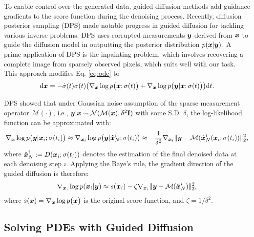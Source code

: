 To enable control over the generated data, guided diffusion methods \cite{dhariwal2021diffusion} add guidance gradients to the score function during the denoising process. Recently, diffusion posterior sampling (DPS) \cite{chung2022diffusion} made notable progress in guided diffusion for tackling various inverse problems. DPS uses corrupted measurements $\boldsymbol{y}$ derived from $\boldsymbol{x}$ to guide the diffusion model in outputting the posterior distribution $p(\boldsymbol{x}|\boldsymbol{y})$. A prime application of DPS is the inpainting problem, which involves recovering a complete image from sparsely observed pixels, which suits well with our task. This approach modifies Eq. \ref{eq:ode} to
\begin{equation}
    \label{eq:ode-dps}
    \mathrm{d}\boldsymbol{x} = -\dot{\sigma}(t) \sigma(t) \big(\nabla_{\boldsymbol{x}}\log p\big(\boldsymbol{x};\sigma(t)\big)+\nabla_{\boldsymbol{x}}\log p\big(\boldsymbol{y}|\boldsymbol{x};\sigma(t)\big)\big)\mathrm{d}t.
\end{equation}

DPS \cite{chung2022diffusion} showed that under Gaussian noise assumption of the sparse measurement operator $\mathcal{M}(\cdot)$, i.e., $\boldsymbol{y}|\boldsymbol{x} \sim \mathcal{N}(\mathcal{M}(\boldsymbol{x}), \delta^2\mathbf{I})$ with some S.D. $\delta$, the log-likelihood function can be approximated with:
\begin{equation}
    \nabla_{\boldsymbol{x}}\log p\big(\boldsymbol{y}|\boldsymbol{x}_i;\sigma(t_i)\big)\approx \nabla_{\boldsymbol{x}_i}\log p\big(\boldsymbol{y}|\boldsymbol{\hat{x}}_N^i;\sigma(t_i)\big)\approx -\frac1{\delta^2}\nabla_{\boldsymbol{x}_i}\|\boldsymbol{y}-\mathcal{M}(\hat{\boldsymbol{x}}_N^i(\boldsymbol{x}_i;\sigma(t_i))\|_2^2,
\end{equation}
where $\hat{\boldsymbol{x}}_N^i:=D(\boldsymbol{x}_i;\sigma(t_i))$ denotes the estimation of the final denoised data at each denoising step $i$. Applying the Baye's rule, the gradient direction of the guided diffusion is therefore:
\begin{equation}\label{eq:dps-posterior}
    \nabla_{\boldsymbol{x}_i}\log p(\boldsymbol{x}_i|\boldsymbol{y})\approx s(\boldsymbol{x}_i)-\zeta\nabla_{\boldsymbol{x}_i}\|\boldsymbol{y}-\mathcal{M}(\hat{\boldsymbol{x}}_N^i)\|_2^2,
\end{equation}
where $s(\boldsymbol{x})=\nabla_{\boldsymbol{x}}\log p\big(\boldsymbol{x}\big)$ is the original score function, and $\zeta=1/\delta^2$. 



\subsection{Solving PDEs with Guided Diffusion}\label{sec:method}

